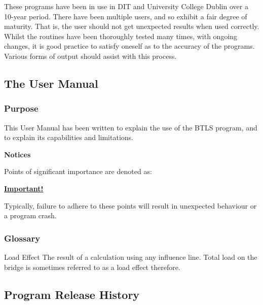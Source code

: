 \documentclass[
]{article}
\begin{document}
These programs have been in use in DIT and University College Dublin
over a 10-year period. There have been multiple users, and so exhibit a
fair degree of maturity. That is, the user should not get unexpected
results when used correctly. Whilst the routines have been thoroughly
tested many times, with ongoing changes, it is good practice to satisfy
oneself as to the accuracy of the programs. Various forms of output
should assist with this process.

\subsection{The User Manual}\label{the-user-manual}

\subsubsection*{Purpose}\label{purpose}

This User Manual has been written to explain the use of the BTLS
program, and to explain its capabilities and limitations.

\textbf{Notices}

Points of significant importance are denoted as:

\textbf{\ul{Important!}}

Typically, failure to adhere to these points will result in unexpected
behaviour or a program crash.

\subsubsection*{\texorpdfstring{\hfill\break
Glossary}{ Glossary}}\label{glossary}

Load Effect The result of a calculation using any influence line. Total
load on the bridge is sometimes referred to as a load effect therefore.

\subsection{Program Release History}\label{program-release-history}
\end{document}

